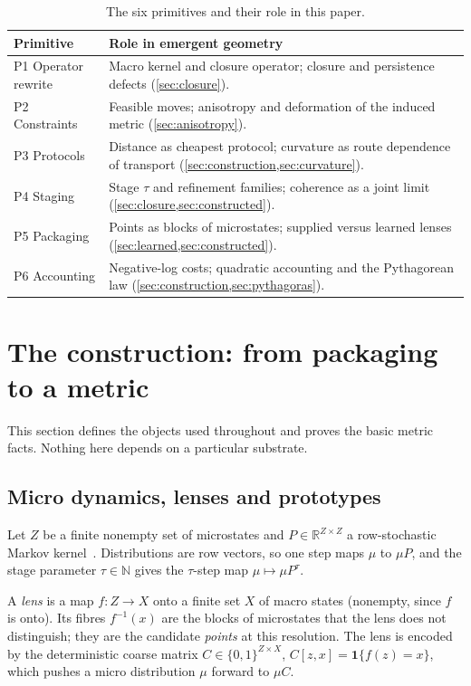 \documentclass[11pt]{article}
\newcommand{\R}{\mathbb{R}}
\newcommand{\N}{\mathbb{N}}
\newcommand{\one}{\mathbf{1}}
\begin{document}
\begin{table}[t]
\centering
\small
\caption{The six primitives and their role in this paper.}
\label{tab:six-birds-geometry}
\begin{tabularx}{\textwidth}{@{}>{\raggedright\arraybackslash}p{}X@{}}
\toprule
Primitive & Role in emergent geometry \\
\midrule
P1 Operator rewrite & Macro kernel and closure operator; closure and persistence defects (\cref{sec:closure}). \\
P2 Constraints & Feasible moves; anisotropy and deformation of the induced metric (\cref{sec:anisotropy}). \\
P3 Protocols & Distance as cheapest protocol; curvature as route dependence of transport (\cref{sec:construction,sec:curvature}). \\
P4 Staging & Stage $\tau$ and refinement families; coherence as a joint limit (\cref{sec:closure,sec:constructed}). \\
P5 Packaging & Points as blocks of microstates; supplied versus learned lenses (\cref{sec:learned,sec:constructed}). \\
P6 Accounting & Negative-log costs; quadratic accounting and the Pythagorean law (\cref{sec:construction,sec:pythagoras}). \\
\bottomrule
\end{tabularx}
\end{table}
 \section{The construction: from packaging to a metric}
\label{sec:construction}

This section defines the objects used throughout and proves the basic metric facts.
Nothing here depends on a particular substrate.

\subsection{Micro dynamics, lenses and prototypes}

Let $Z$ be a finite nonempty set of microstates and $P\in\R^{Z\times Z}$ a row-stochastic Markov kernel~\cite{Norris1997}.
Distributions are row vectors, so one step maps $\mu$ to $\mu P$, and the stage parameter $\tau\in\N$ gives the $\tau$-step map $\mu\mapsto\mu P^{\tau}$.

A \emph{lens} is a map $f\colon Z\to X$ onto a finite set $X$ of macro states (nonempty, since $f$ is onto).
Its fibres $f^{-1}(x)$ are the blocks of microstates that the lens does not distinguish; they are the candidate \emph{points} at this resolution.
The lens is encoded by the deterministic coarse matrix $C\in\{0,1\}^{Z\times X}$, $C[z,x]=\one\{f(z)=x\}$, which pushes a micro distribution $\mu$ forward to $\mu C$.
\end{document}
